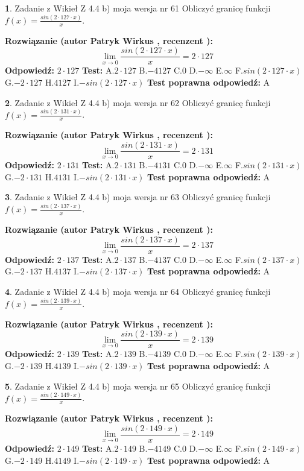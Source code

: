 \documentclass[12pt, a4paper]{article}
\theoremstyle{definition} %
\newtheorem{zad}{}
\newcommand{\zadStart}[1]{\begin{zad}#1\newline}
\newcommand{\zadStop}{\end{zad}}
\newcommand{\rozwStart}[2]{\noindent \textbf{Rozwiązanie (autor #1 , recenzent #2): }\newline}
\newcommand{\rozwStop}{\newline}
\newcommand{\odpStart}{\noindent \textbf{Odpowiedź:}\newline}
\newcommand{\odpStop}{\newline}
\newcommand{\testStart}{\noindent \textbf{Test:}\newline}
\newcommand{\testStop}{\newline}
\newcommand{\kluczStart}{\noindent \textbf{Test poprawna odpowiedź:}\newline}
\newcommand{\kluczStop}{\newline}
\begin{document}
\zadStart{Zadanie z Wikieł Z 4.4 b) moja wersja nr 61}
Obliczyć granicę funkcji $f(x)=\frac{sin(2 \cdot127\cdot x)}{x}$.
\zadStop
\rozwStart{Patryk Wirkus}{}
$$\lim\limits_{x\to 0}\frac{sin(2 \cdot 127\cdot x)}{x}=
2 \cdot 127$$
\rozwStop
\odpStart
$2 \cdot 127$
\odpStop
\testStart
A.$2 \cdot 127$
B.$-4127$
C.$0$
D.$-\infty$
E.$\infty$
F.$sin(2 \cdot 127\cdot x)$
G.$-2 \cdot 127$
H.$4127$
I.$-sin(2 \cdot 127\cdot x)$
\testStop
\kluczStart
A
\kluczStop



\zadStart{Zadanie z Wikieł Z 4.4 b) moja wersja nr 62}
Obliczyć granicę funkcji $f(x)=\frac{sin(2 \cdot131\cdot x)}{x}$.
\zadStop
\rozwStart{Patryk Wirkus}{}
$$\lim\limits_{x\to 0}\frac{sin(2 \cdot 131\cdot x)}{x}=
2 \cdot 131$$
\rozwStop
\odpStart
$2 \cdot 131$
\odpStop
\testStart
A.$2 \cdot 131$
B.$-4131$
C.$0$
D.$-\infty$
E.$\infty$
F.$sin(2 \cdot 131\cdot x)$
G.$-2 \cdot 131$
H.$4131$
I.$-sin(2 \cdot 131\cdot x)$
\testStop
\kluczStart
A
\kluczStop



\zadStart{Zadanie z Wikieł Z 4.4 b) moja wersja nr 63}
Obliczyć granicę funkcji $f(x)=\frac{sin(2 \cdot137\cdot x)}{x}$.
\zadStop
\rozwStart{Patryk Wirkus}{}
$$\lim\limits_{x\to 0}\frac{sin(2 \cdot 137\cdot x)}{x}=
2 \cdot 137$$
\rozwStop
\odpStart
$2 \cdot 137$
\odpStop
\testStart
A.$2 \cdot 137$
B.$-4137$
C.$0$
D.$-\infty$
E.$\infty$
F.$sin(2 \cdot 137\cdot x)$
G.$-2 \cdot 137$
H.$4137$
I.$-sin(2 \cdot 137\cdot x)$
\testStop
\kluczStart
A
\kluczStop



\zadStart{Zadanie z Wikieł Z 4.4 b) moja wersja nr 64}
Obliczyć granicę funkcji $f(x)=\frac{sin(2 \cdot139\cdot x)}{x}$.
\zadStop
\rozwStart{Patryk Wirkus}{}
$$\lim\limits_{x\to 0}\frac{sin(2 \cdot 139\cdot x)}{x}=
2 \cdot 139$$
\rozwStop
\odpStart
$2 \cdot 139$
\odpStop
\testStart
A.$2 \cdot 139$
B.$-4139$
C.$0$
D.$-\infty$
E.$\infty$
F.$sin(2 \cdot 139\cdot x)$
G.$-2 \cdot 139$
H.$4139$
I.$-sin(2 \cdot 139\cdot x)$
\testStop
\kluczStart
A
\kluczStop



\zadStart{Zadanie z Wikieł Z 4.4 b) moja wersja nr 65}
Obliczyć granicę funkcji $f(x)=\frac{sin(2 \cdot149\cdot x)}{x}$.
\zadStop
\rozwStart{Patryk Wirkus}{}
$$\lim\limits_{x\to 0}\frac{sin(2 \cdot 149\cdot x)}{x}=
2 \cdot 149$$
\rozwStop
\odpStart
$2 \cdot 149$
\odpStop
\testStart
A.$2 \cdot 149$
B.$-4149$
C.$0$
D.$-\infty$
E.$\infty$
F.$sin(2 \cdot 149\cdot x)$
G.$-2 \cdot 149$
H.$4149$
I.$-sin(2 \cdot 149\cdot x)$
\testStop
\kluczStart
A
\kluczStop
\end{document}
